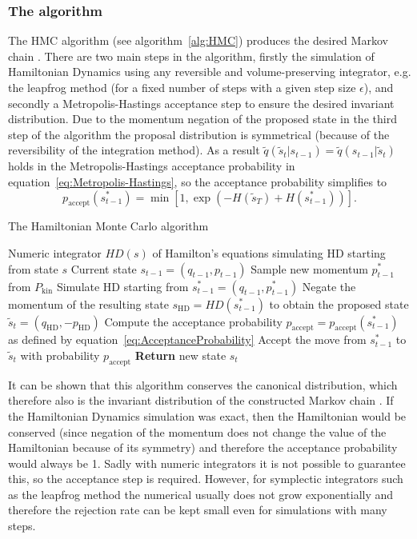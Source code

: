 \subsubsection{The algorithm}
The HMC algorithm (see algorithm~\ref{alg:HMC}) produces the desired Markov chain \parencite{Neal2011}. There are two main steps in the algorithm, firstly the simulation of Hamiltonian Dynamics using any reversible and volume-preserving integrator, e.g. the leapfrog method (for a fixed number of steps with a given step size $\epsilon$), and secondly a Metropolis-Hastings acceptance step to ensure the desired invariant distribution. Due to the momentum negation of the proposed state in the third step of the algorithm the proposal distribution is symmetrical (because of the reversibility of the integration method). As a result $\tilde{q}(\tilde{s}_t|s_{t-1}) = \tilde{q}(s_{t-1}|\tilde{s}_t)$ holds in the Metropolis-Hastings acceptance probability in equation~\eqref{eq:Metropolis-Hastings}, so the acceptance probability simplifies to
\begin{equation} \label{eq:AcceptanceProbability}
p_{\textrm{accept}}(s^*_{t-1}) = \min[1, \exp(-H(\tilde{s}_T) + H(s^*_{t-1}))].
\end{equation}

\begin{algorithm}
\caption{The Hamiltonian Monte Carlo algorithm}\label{alg:HMC}
\begin{algorithmic}[1]
\Require Numeric integrator $HD(s)$ of Hamilton's equations simulating HD starting from state $s$
\Require Current state $s_{t-1} = (q_{t-1}, p_{t-1})$
\State Sample new momentum $p^*_{t-1}$ from $P_\textrm{kin}$
\State Simulate HD starting from $s^*_{t-1} = (q_{t-1}, p^*_{t-1})$
\State Negate the momentum of the resulting state $s_\textrm{HD} = HD(s^*_{t-1})$ to obtain the proposed state $\tilde{s}_t = (q_\textrm{HD}, - p_\textrm{HD})$
\State Compute the acceptance probability $p_\textrm{accept}=p_\textrm{accept}(s^*_{t-1})$ as defined by equation~\eqref{eq:AcceptanceProbability}
\State Accept the move from $s^*_{t-1}$ to $\tilde{s}_t$ with probability $p_\textrm{accept}$
\State \textbf{Return} new state $s_t$
\end{algorithmic}
\end{algorithm}

It can be shown that this algorithm conserves the canonical distribution, which therefore also is the invariant distribution of the constructed Markov chain \parencite{Neal2011}. If the Hamiltonian Dynamics simulation was exact, then the Hamiltonian would be conserved (since negation of the momentum does not change the value of the Hamiltonian because of its symmetry) and therefore the acceptance probability would always be 1. Sadly with numeric integrators it is not possible to guarantee this, so the acceptance step is required. However, for symplectic integrators such as the leapfrog method the numerical usually does not grow exponentially and therefore the rejection rate can be kept small even for simulations with many steps.

